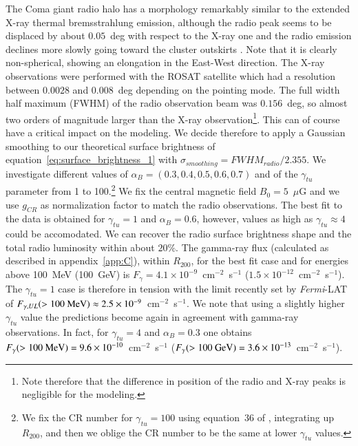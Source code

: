 \documentclass[traditabstract]{aa}
\begin{document}
The Coma giant radio halo has a morphology remarkably similar to the extended X-ray thermal bremsstrahlung emission, although the radio peak seems to be displaced by about $0.05$~deg with respect to the X-ray one and the radio emission declines more slowly going toward the cluster outskirts \citep{1992A&A...259L..31B,1997A&A...321...55D}. Note that it is clearly non-spherical, showing an elongation in the East-West direction. The \cite{1992A&A...259L..31B} X-ray observations were performed with the ROSAT satellite which had a resolution between $0.0028$ and $0.008$~deg depending on the pointing mode. The full width half maximum (FWHM) of the \cite{1997A&A...321...55D} radio observation beam was $0.156$~deg, so almost two orders of magnitude larger than the X-ray observation\footnote[12]{Note therefore that the difference in position of the radio and X-ray peaks is negligible for the modeling.}. This can of course have a critical impact on the modeling. We decide therefore to apply a Gaussian smoothing to our theoretical surface brightness of equation~\ref{eq:surface_brightness_1} with $\sigma_{smoothing} = FWHM_{radio}/2.355$. We investigate different values of $\alpha_B=(0.3,0.4,0.5,0.6,0.7)$ and of the $\gamma_{tu}$ parameter from 1 to 100.\footnote[13]{We fix the CR number for $\gamma_{tu}=100$ using equation~36 of \cite{2011A&A...527A..99E}, integrating up $R_{200}$, and then we oblige the CR number to be the same at lower $\gamma_{tu}$ values.} We fix the central magnetic field $B_{0}=5$~$\mu$G \citep{2010A&A...513A..30B} and we use $g_{CR}$ as normalization factor to match the radio observations. The best fit to the data is obtained for $\gamma_{tu}=1$ and $\alpha_B=0.6$, however, values as high as $\gamma_{tu} \approx 4$ could be accomodated. We can recover the radio surface brightness shape and the total radio luminosity within about $20\%$. The gamma-ray flux (calculated as described in appendix~\ref{app:C}), within $R_{200}$, for the best fit case and for energies above 100~MeV (100~GeV) is $F_{\gamma} = 4.1 \times 10^{-9}$~cm$^{-2}$~s$^{-1}$ ($1.5 \times 10^{-12}$~cm$^{-2}$~s$^{-1}$). The $\gamma_{tu} = 1$ case is therefore in tension with the limit recently set by \emph{Fermi}-LAT \citep{2012AAS...21920701Z} of $F_{\gamma, UL} (>100~\rm{MeV}) \approx 2.5 \times 10^{-9}$~cm$^{-2}$~s$^{-1}$. We note that using a slightly higher $\gamma_{tu}$ value the predictions become again in agreement with gamma-ray observations. In fact, for $\gamma_{tu} = 4$ and $\alpha_B=0.3$ one obtains $F_{\gamma} (>100~\rm{MeV}) = 9.6 \times 10^{-10}$~cm$^{-2}$~s$^{-1}$ ($F_{\gamma} (>100~\rm{GeV}) = 3.6 \times 10^{-13}$~cm$^{-2}$~s$^{-1}$). 
\end{document}
